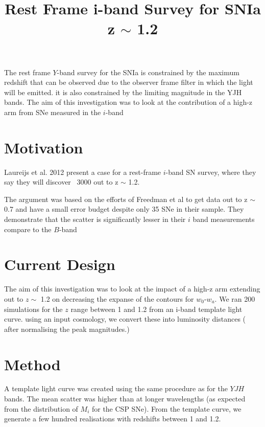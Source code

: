 \documentclass{article}
\begin{document}
\title{Rest Frame i-band Survey for SNIa z $\sim$ 1.2}
\maketitle

The rest frame $Y$-band survey for the SNIa is constrained by the maximum redshift that can be observed due to the observer frame filter in which the light will be emitted. it is also constrained by 
the limiting magnitude in the YJH bands. 
The aim of this investigation was to look at the contribution of a high-z arm from SNe measured in the $i$-band

\section{Motivation}
Laureijs et al. 2012 present a case for a rest-frame $i$-band SN survey, where they say they will discover ~3000 out to z $\sim$ 1.2.




The argument was based on the efforts of Freedman et al to get data out to z $\sim$ 0.7 and have a small error budget despite only 35 SNe in their sample. They demonstrate that the scatter is significantly lesser in their $i$ band measurements compare to the $B$-band

\section{Current Design}
The aim of this investigation was to look at the impact of a high-z arm extending out to $z \sim$ 1.2 on decreasing the expanse of the contours for $w_0$-$w_a$. 
We ran 200 simulations for the $z$ range between 1 and 1.2 from an i-band template light curve. using an input cosmology, we convert these into luminosity distances ( after normalising the peak magnitudes.)

\section{Method}
A template light curve was created using the same procedure as for the $YJH$ bands. The mean scatter was higher than at longer wavelengths (as expected from the distribution of $M_i$ for the CSP SNe).
From the template curve, we generate a few hundred realisations with redshifts between 1 and 1.2.
\end{document}
